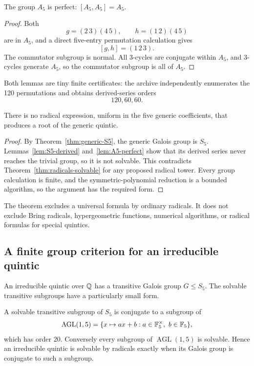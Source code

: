 \begin{lemma}\label{lem:A5-perfect}
The group \(A_5\) is perfect: \([A_5,A_5]=A_5\).
\end{lemma}

\begin{proof}
Both
\[
 g=(2\,3)(4\,5),
 \qquad h=(1\,2)(4\,5)
\]
are in \(A_5\), and a direct five-entry permutation calculation gives
\[
 [g,h]=(1\,2\,3).
\]
The commutator subgroup is normal.  All 3-cycles are conjugate within
\(A_5\), and 3-cycles generate \(A_5\), so the commutator subgroup is all of
\(A_5\).
\end{proof}

Both lemmas are tiny finite certificates: the archive independently enumerates
the 120 permutations and obtains derived-series orders
\[
 120,60,60.
\]

\begin{theorem}
\label{thm:abel-ruffini}
There is no radical expression, uniform in the five generic coefficients, that
produces a root of the generic quintic.
\end{theorem}

\begin{proof}
By Theorem~\ref{thm:generic-S5}, the generic Galois group is \(S_5\).
Lemmas~\ref{lem:S5-derived} and~\ref{lem:A5-perfect} show that its derived
series never reaches the trivial group, so it is not solvable.  This contradicts
Theorem~\ref{thm:radicals-solvable} for any proposed radical tower.  Every group
calculation is finite, and the symmetric-polynomial reduction is a bounded
algorithm, so the argument has the required \ipra{} form.
\end{proof}

The theorem excludes a universal formula by ordinary radicals.  It does not
exclude Bring radicals, hypergeometric functions, numerical algorithms, or
radical formulas for special quintics.

\subsection{A finite group criterion for an irreducible quintic}

An irreducible quintic over \(\mathbb Q\) has a transitive Galois group
\(G\le S_5\).  The solvable transitive subgroups have a particularly small
form.

\begin{theorem}
\label{thm:AGL-criterion}
A solvable transitive subgroup of \(S_5\) is conjugate to a subgroup of
\begin{equation}\label{eq:AGL}
 \operatorname{AGL}(1,5)
 =\{x\mapsto ax+b:a\in\mathbb F_5^\times,\ b\in\mathbb F_5\},
\end{equation}
which has order \(20\).  Conversely every subgroup of
\(\operatorname{AGL}(1,5)\) is solvable.  Hence an irreducible quintic is
solvable by radicals exactly when its Galois group is conjugate to such a
subgroup.
\end{theorem}


